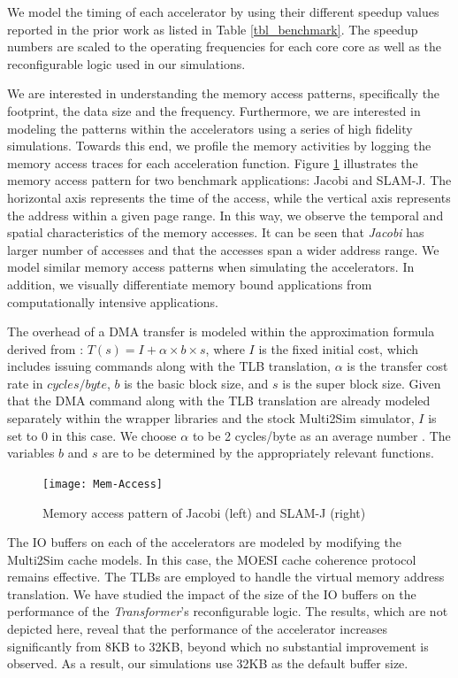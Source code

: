 We model the timing of each accelerator by using their different
speedup values reported in the prior work as listed in Table
\ref{tbl_benchmark}. The speedup numbers are scaled to the 
operating frequencies for each core core as well as the reconfigurable logic used in our
simulations. 

We are interested in understanding the memory access
patterns, specifically the footprint, the data size and the frequency.  Furthermore, we are interested in modeling
the patterns within the accelerators using a series of high fidelity simulations. Towards this end, we profile the memory
activities by logging the memory access traces for each 
acceleration function.
Figure \ref{fig_mem_access} illustrates the memory access pattern for
two benchmark applications: Jacobi and SLAM-J. The horizontal axis represents
the time of the access, while the vertical axis represents the address within a given 
page range. In this way, we observe the temporal and spatial
characteristics of the memory accesses. It can be seen that {\em
  Jacobi} has larger number of accesses and that the
accesses span a wider address range. We model similar memory
access patterns when simulating the accelerators.  In addition, we visually
differentiate memory bound applications from computationally intensive
applications. 

The overhead of a DMA transfer is modeled within the approximation
formula derived from \cite{Saidi:2012}: $ T(s) = I + \alpha \times b \times
s$, where $I$ is the fixed initial cost, which includes issuing commands
along with the TLB translation, $\alpha$ is the transfer cost rate in
$cycles/byte$, $b$ is the basic block size, and $s$ is the super block
size. Given that the DMA command along with the TLB translation are already modeled separately within the wrapper libraries and
the stock Multi2Sim simulator, $I$ is set to 0 in this case. We choose $\alpha$
to be 2 cycles/byte as an average number \cite{Saidi:2012}. The variables $b$ and $s$
are to be determined by the appropriately relevant functions.


\begin{figure}
    \centering
    \texttt{[image: Mem-Access]}
	\caption{Memory access pattern of Jacobi (left) and SLAM-J (right)}
\label{fig_mem_access}
\end{figure}


The IO buffers on each of the accelerators are modeled by
modifying the Multi2Sim cache models. In this case, the MOESI cache coherence
protocol remains effective. The TLBs are employed to handle the virtual memory
address translation.  We have studied the impact of the size of the IO
buffers on the performance of the {\em Transformer}'s reconfigurable
logic. The results, which are not depicted here, reveal that the performance of
the accelerator increases significantly from 8KB to 32KB, beyond which no
substantial improvement is observed. As a result, our simulations use 32KB as
the default buffer size.

